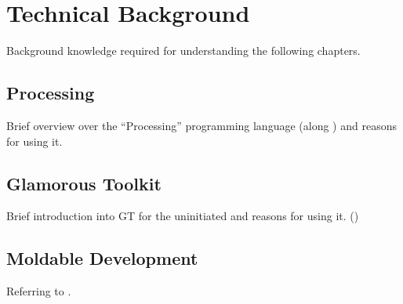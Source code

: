 
\chapter{Technical Background} \label{ch_background}
Background knowledge required for understanding the following chapters.

\section{Processing} \label{sc_processing}
Brief overview over the ``Processing'' programming language (along \cite{Cas14}) and reasons for using it.

\section{Glamorous Toolkit} \label{sc_gt}
Brief introduction into GT for the uninitiated and reasons for using it. (\cite{Gir23})

\section{Moldable Development}
Referring to \cite{Nie24}.
